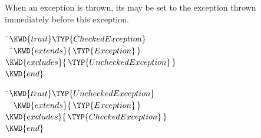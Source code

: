 When an exception is thrown, its  may be set to the exception
thrown immediately before this exception.



\begin{Fortress}
{\tt~}\pushtabs\=\+\( \KWD{trait} \TYP{CheckedException} \)\\
{\tt~~}\pushtabs\=\+\(   \KWD{extends} \{\,\TYP{Exception}\,\}\)\\
\(   \KWD{excludes} \{\,\TYP{UncheckedException}\,\}\)\-\\\poptabs
\( \KWD{end}\)\-\\\poptabs
\end{Fortress}


\begin{Fortress}
{\tt~}\pushtabs\=\+\( \KWD{trait} \TYP{UncheckedException} \)\\
{\tt~~}\pushtabs\=\+\(   \KWD{extends} \{\,\TYP{Exception}\,\}\)\\
\(   \KWD{excludes} \{\,\TYP{CheckedException}\,\}\)\-\-\\\poptabs\poptabs
\(\KWD{end}\)
\end{Fortress}
